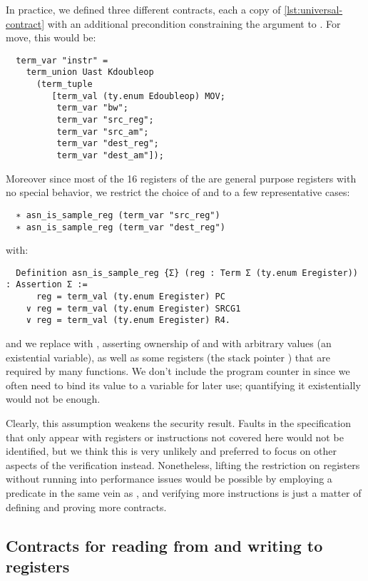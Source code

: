 In practice, we defined three different contracts, each a copy of \cref{lst:universal-contract} with an additional precondition constraining the  argument to . For move, this would be:
\begin{verbatim}
  term_var "instr" =
    term_union Uast Kdoubleop
      (term_tuple
         [term_val (ty.enum Edoubleop) MOV;
          term_var "bw";
          term_var "src_reg";
          term_var "src_am";
          term_var "dest_reg";
          term_var "dest_am"]);
\end{verbatim}

Moreover since most of the 16 registers of the \msp are general purpose registers with no special behavior, we restrict the choice of  and  to a few representative cases:
\begin{verbatim}
  ∗ asn_is_sample_reg (term_var "src_reg")
  ∗ asn_is_sample_reg (term_var "dest_reg")
\end{verbatim}
with:
\begin{verbatim}
  Definition asn_is_sample_reg {Σ} (reg : Term Σ (ty.enum Eregister)) : Assertion Σ :=
      reg = term_val (ty.enum Eregister) PC
    ∨ reg = term_val (ty.enum Eregister) SRCG1
    ∨ reg = term_val (ty.enum Eregister) R4.
\end{verbatim}
and we replace  with , asserting ownership of  and  with arbitrary values (an existential variable), as well as some registers (\eg the stack pointer ) that are required by many functions. We don't include the program counter in  since we often need to bind its value to a variable for later use; quantifying it existentially would not be enough.

Clearly, this assumption weakens the security result. Faults in the specification that only appear with registers or instructions not covered here would not be identified, but we think this is very unlikely and preferred to focus on other aspects of the verification instead. Nonetheless, lifting the restriction on registers without running into performance issues would be possible by employing a predicate in the same vein as , and verifying more instructions is just a matter of defining and proving more contracts.

\subsection{Contracts for reading from and writing to registers}

